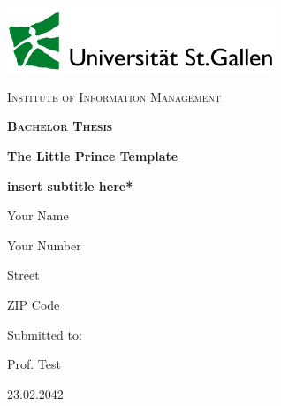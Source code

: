 
\begin{titlepage}
  \centering
  \includegraphics[width=8cm]{01_head/images/HSGLogo.png}\par\vspace{1cm}
  \linespread{1}\Large{\scshape Institute of Information Management\par}
  \vspace{1.5cm}
  {\scshape\Large\bfseries Bachelor Thesis\par}
  {\huge\bfseries The Little Prince Template \par
    \Large\bfseries *insert subtitle here*\par}
  \vspace{1.5cm}
  \linespread{0.75}\Large{Your Name\par Your Number\par Street\par ZIP Code}
  \vfill
  \linespread{0.75}\large{Submitted to:\par
    Prof. Test}
  \vfill
  {\large 23.02.2042\par}
\end{titlepage}
